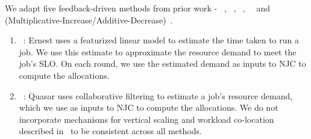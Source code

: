 We adapt five feedback-driven methods from prior work - \ernest~\cite{venkataraman2016ernest},
\quasar~\cite{delimitrou2014quasar},  \minerva~\cite{nathan2019end},
\parties~\cite{chen2019parties}~and \AIMD{}
(Multiplicative-Increase/Additive-Decrease)~\cite{chiu1989analysis}.

\begin{enumerate}[label=\arabic*)]

    \item \ernest~\cite{venkataraman2016ernest}:
    Ernest uses a featurized linear model  to estimate the
    time taken to run a job.
    We use this estimate to approximate the resource demand to meet the job's SLO.
    On each round, we use the estimated demand as inputs to NJC to compute the allocations.
    \vspace{-0.05in}
    
    \item \quasar~\cite{delimitrou2014quasar}:
    Quasar uses collaborative filtering to estimate a job's resource demand, which we
    use as inputs to NJC to compute the allocations.
    We do not incorporate mechanisms for vertical scaling and workload co-location described
    in~\cite{delimitrou2014quasar} to be consistent across all methods.
    \vspace{-0.05in}
    

\end{enumerate}
